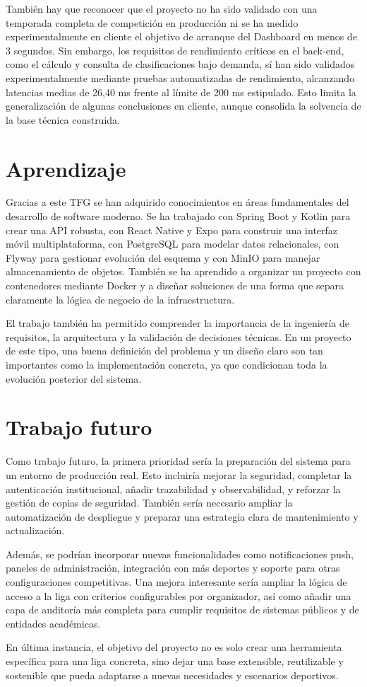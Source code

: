También hay que reconocer que el proyecto no ha sido validado con una temporada completa de competición en producción ni se ha medido experimentalmente en cliente el objetivo de arranque del Dashboard en menos de 3 segundos. Sin embargo, los requisitos de rendimiento críticos en el back-end, como el cálculo y consulta de clasificaciones bajo demanda, sí han sido validados experimentalmente mediante pruebas automatizadas de rendimiento, alcanzando latencias medias de 26,40 ms frente al límite de 200 ms estipulado. Esto limita la generalización de algunas conclusiones en cliente, aunque consolida la solvencia de la base técnica construida.

\section{Aprendizaje}

Gracias a este \ac{TFG} se han adquirido conocimientos en áreas fundamentales del desarrollo de software moderno. Se ha trabajado con Spring Boot y Kotlin para crear una API robusta, con React Native y Expo para construir una interfaz móvil multiplataforma, con PostgreSQL para modelar datos relacionales, con Flyway para gestionar evolución del esquema y con MinIO para manejar almacenamiento de objetos. También se ha aprendido a organizar un proyecto con contenedores mediante Docker y a diseñar soluciones de una forma que separa claramente la lógica de negocio de la infraestructura.

El trabajo también ha permitido comprender la importancia de la ingeniería de requisitos, la arquitectura y la validación de decisiones técnicas. En un proyecto de este tipo, una buena definición del problema y un diseño claro son tan importantes como la implementación concreta, ya que condicionan toda la evolución posterior del sistema.

\section{Trabajo futuro}

Como trabajo futuro, la primera prioridad sería la preparación del sistema para un entorno de producción real. Esto incluiría mejorar la seguridad, completar la autenticación institucional, añadir trazabilidad y observabilidad, y reforzar la gestión de copias de seguridad. También sería necesario ampliar la automatización de despliegue y preparar una estrategia clara de mantenimiento y actualización.

Además, se podrían incorporar nuevas funcionalidades como notificaciones push, paneles de administración, integración con más deportes y soporte para otras configuraciones competitivas. Una mejora interesante sería ampliar la lógica de acceso a la liga con criterios configurables por organizador, así como añadir una capa de auditoría más completa para cumplir requisitos de sistemas públicos y de entidades académicas.

En última instancia, el objetivo del proyecto no es solo crear una herramienta específica para una liga concreta, sino dejar una base extensible, reutilizable y sostenible que pueda adaptarse a nuevas necesidades y escenarios deportivos.

